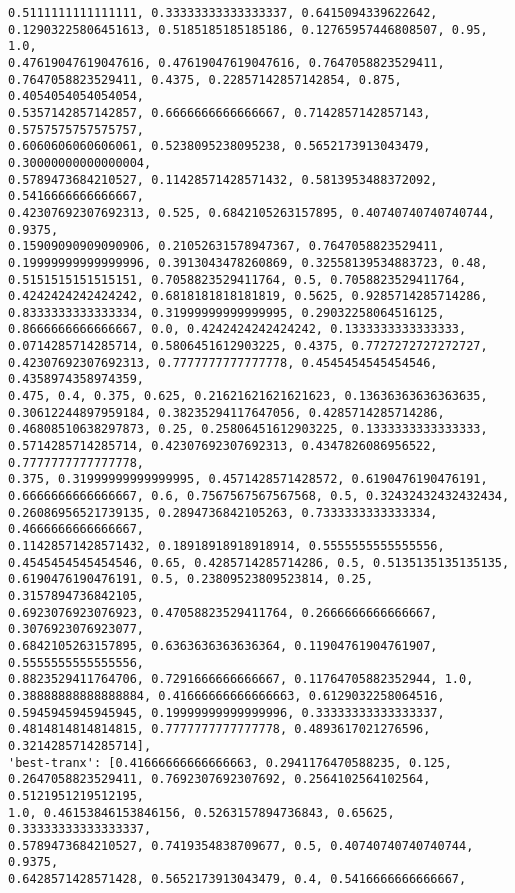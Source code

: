 \documentclass[11pt]{article}
\begin{document}
\begin{Verbatim}[commandchars=\\\{\}]
0.5111111111111111, 0.33333333333333337, 0.6415094339622642,
0.12903225806451613, 0.5185185185185186, 0.12765957446808507, 0.95, 1.0,
0.47619047619047616, 0.47619047619047616, 0.7647058823529411,
0.7647058823529411, 0.4375, 0.22857142857142854, 0.875, 0.4054054054054054,
0.5357142857142857, 0.6666666666666667, 0.7142857142857143, 0.5757575757575757,
0.6060606060606061, 0.5238095238095238, 0.5652173913043479, 0.30000000000000004,
0.5789473684210527, 0.11428571428571432, 0.5813953488372092, 0.5416666666666667,
0.42307692307692313, 0.525, 0.6842105263157895, 0.40740740740740744, 0.9375,
0.15909090909090906, 0.21052631578947367, 0.7647058823529411,
0.19999999999999996, 0.3913043478260869, 0.32558139534883723, 0.48,
0.5151515151515151, 0.7058823529411764, 0.5, 0.7058823529411764,
0.4242424242424242, 0.6818181818181819, 0.5625, 0.9285714285714286,
0.8333333333333334, 0.31999999999999995, 0.29032258064516125,
0.8666666666666667, 0.0, 0.4242424242424242, 0.1333333333333333,
0.0714285714285714, 0.5806451612903225, 0.4375, 0.7727272727272727,
0.42307692307692313, 0.7777777777777778, 0.4545454545454546, 0.4358974358974359,
0.475, 0.4, 0.375, 0.625, 0.21621621621621623, 0.13636363636363635,
0.30612244897959184, 0.38235294117647056, 0.4285714285714286,
0.46808510638297873, 0.25, 0.25806451612903225, 0.1333333333333333,
0.5714285714285714, 0.42307692307692313, 0.4347826086956522, 0.7777777777777778,
0.375, 0.31999999999999995, 0.4571428571428572, 0.6190476190476191,
0.6666666666666667, 0.6, 0.7567567567567568, 0.5, 0.32432432432432434,
0.26086956521739135, 0.2894736842105263, 0.7333333333333334, 0.4666666666666667,
0.11428571428571432, 0.18918918918918914, 0.5555555555555556,
0.4545454545454546, 0.65, 0.4285714285714286, 0.5, 0.5135135135135135,
0.6190476190476191, 0.5, 0.23809523809523814, 0.25, 0.3157894736842105,
0.6923076923076923, 0.47058823529411764, 0.2666666666666667, 0.3076923076923077,
0.6842105263157895, 0.6363636363636364, 0.11904761904761907, 0.5555555555555556,
0.8823529411764706, 0.7291666666666667, 0.11764705882352944, 1.0,
0.38888888888888884, 0.41666666666666663, 0.6129032258064516,
0.5945945945945945, 0.19999999999999996, 0.33333333333333337,
0.4814814814814815, 0.7777777777777778, 0.4893617021276596, 0.3214285714285714],
'best-tranx': [0.41666666666666663, 0.2941176470588235, 0.125,
0.2647058823529411, 0.7692307692307692, 0.2564102564102564, 0.5121951219512195,
1.0, 0.46153846153846156, 0.5263157894736843, 0.65625, 0.33333333333333337,
0.5789473684210527, 0.7419354838709677, 0.5, 0.40740740740740744, 0.9375,
0.6428571428571428, 0.5652173913043479, 0.4, 0.5416666666666667,

\end{Verbatim}
\end{document}
